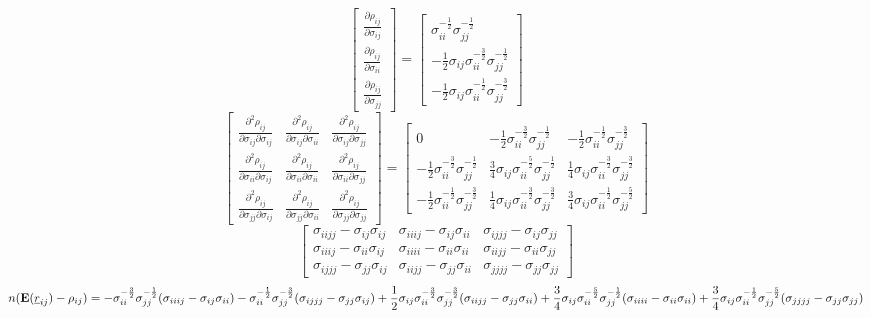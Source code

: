\documentclass[
  12pt,
  letterpaper,
  DIV=11,
  numbers=noendperiod]{scrartcl}
\newcommand{\ul}[1]{\underline{#1}}
\begin{document}
\[
\begin{bmatrix}
\frac{\partial \rho_{ij}}{\partial \sigma_{ij}}\\
\frac{\partial \rho_{ij}}{\partial \sigma_{ii}}\\
\frac{\partial \rho_{ij}}{\partial \sigma_{jj}}
\end{bmatrix}=
\begin{bmatrix}
\sigma_{ii}^{-\frac12}\sigma_{jj}^{-\frac12}\\
-\frac12 \sigma_{ij}\sigma_{ii}^{-\frac32}\sigma_{jj}^{-\frac12}\\
-\frac12 \sigma_{ij}\sigma_{ii}^{-\frac12}\sigma_{jj}^{-\frac32}
\end{bmatrix}
\] \[
\begin{bmatrix}
\frac{\partial^2\rho_{ij}}{\partial \sigma_{ij}\partial \sigma_{ij}}&\frac{\partial^2\rho_{ij}}{\partial \sigma_{ij}\partial \sigma_{ii}}&\frac{\partial^2\rho_{ij}}{\partial \sigma_{ij}\partial \sigma_{jj}}\\
\frac{\partial^2\rho_{ij}}{\partial \sigma_{ii}\partial \sigma_{ij}}&\frac{\partial^2\rho_{ij}}{\partial \sigma_{ii}\partial \sigma_{ii}}&\frac{\partial^2\rho_{ij}}{\partial \sigma_{ii}\partial \sigma_{jj}}\\
\frac{\partial^2\rho_{ij}}{\partial \sigma_{jj}\partial \sigma_{ij}}&\frac{\partial^2\rho_{ij}}{\partial \sigma_{jj}\partial \sigma_{ii}}&\frac{\partial^2\rho_{ij}}{\partial \sigma_{jj}\partial \sigma_{jj}}
\end{bmatrix}=
\begin{bmatrix}
0&-\frac12\sigma_{ii}^{-\frac32}\sigma_{jj}^{-\frac12}&-\frac12\sigma_{ii}^{-\frac12}\sigma_{jj}^{-\frac32}\\
-\frac12\sigma_{ii}^{-\frac32}\sigma_{jj}^{-\frac12}&\frac34\sigma_{ij}\sigma_{ii}^{-\frac52}\sigma_{jj}^{-\frac12}&
\frac14\sigma_{ij}\sigma_{ii}^{-\frac32}\sigma_{jj}^{-\frac32}\\
-\frac12\sigma_{ii}^{-\frac12}\sigma_{jj}^{-\frac32}&\frac14\sigma_{ij}\sigma_{ii}^{-\frac32}\sigma_{jj}^{-\frac32}&\frac34\sigma_{ij}\sigma_{ii}^{-\frac12}\sigma_{jj}^{-\frac52}
\end{bmatrix}
\] \[
\begin{bmatrix}
\sigma_{iijj}-\sigma_{ij}\sigma_{ij}&\sigma_{iiij}-\sigma_{ij}\sigma_{ii}&\sigma_{ijjj}-\sigma_{ij}\sigma_{jj}\\
\sigma_{iiij}-\sigma_{ii}\sigma_{ij}&\sigma_{iiii}-\sigma_{ii}\sigma_{ii}&\sigma_{iijj}-\sigma_{ii}\sigma_{jj}\\
\sigma_{ijjj}-\sigma_{jj}\sigma_{ij}&\sigma_{iijj}-\sigma_{jj}\sigma_{ii}&\sigma_{jjjj}-\sigma_{jj}\sigma_{jj}
\end{bmatrix}
\] \[
n(\mathbf{E}(\ul{r}_{ij})-\rho_{ij})=
-\sigma_{ii}^{-\frac32}\sigma_{jj}^{-\frac12}(\sigma_{iiij}-\sigma_{ij}\sigma_{ii})
-\sigma_{ii}^{-\frac12}\sigma_{jj}^{-\frac32}(\sigma_{ijjj}-\sigma_{jj}\sigma_{ij})\\
+\frac12\sigma_{ij}\sigma_{ii}^{-\frac32}\sigma_{jj}^{-\frac32}(\sigma_{iijj}-\sigma_{jj}\sigma_{ii})
+\frac34\sigma_{ij}\sigma_{ii}^{-\frac52}\sigma_{jj}^{-\frac12}(\sigma_{iiii}-\sigma_{ii}\sigma_{ii})
+\frac34\sigma_{ij}\sigma_{ii}^{-\frac12}\sigma_{jj}^{-\frac52}(\sigma_{jjjj}-\sigma_{jj}\sigma_{jj})
\]
\end{document}
